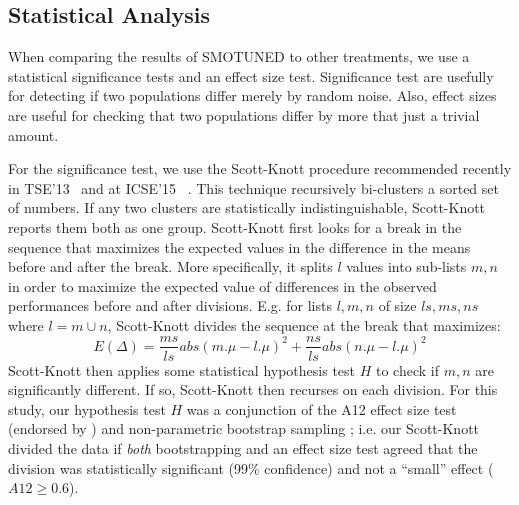\documentclass[10pt,conference]{IEEEtran}
\theoremstyle{break}
\theoremstyle{break}
\begin{document}
   
   
\subsection{Statistical Analysis}

When comparing the results of SMOTUNED to other
treatments, we use a statistical
significance tests and an effect size test.
Significance test are usefully for detecting if two populations
differ merely by random noise. 
Also, effect sizes are useful for checking that two populations differ by more that just a trivial amount.

For the significance test,  we use the 
     Scott-Knott procedure  recommended  recently in TSE'13~\cite{mittas13} and at ICSE'15~\cite{ghotra2015revisiting} . This
     technique recursively bi-clusters a sorted
    set of numbers. If any two clusters are statistically indistinguishable, Scott-Knott
    reports them both as one group.
    Scott-Knott first looks for a break in the sequence that maximizes the expected
    values in the difference in the means before and after the break.
    More specifically,  it  splits $l$ values into sub-lists $m,n$ in order to maximize the expected value of differences  in the observed performances before and after divisions. E.g. for lists $l,m,n$ of size $ls,ms,ns$ where $l=m\cup n$, Scott-Knott divides the sequence at the break that maximizes:
     \[E(\Delta)=\frac{ms}{ls}abs(m.\mu - l.\mu)^2 + \frac{ns}{ls}abs(n.\mu - l.\mu)^2\]
Scott-Knott then applies some statistical hypothesis test $H$ to check if $m,n$ are significantly different. If so, Scott-Knott then recurses on each division.
    For this study, our hypothesis test $H$ was a conjunction of the A12 effect size test (endorsed by
    \cite{arcuri11})  and non-parametric bootstrap sampling \cite{efron94}; i.e. our Scott-Knott divided the data if {\em both}
    bootstrapping and an effect size test agreed that the division was statistically significant (99\% confidence) and not a ``small'' effect ($A12 \ge 0.6$).




\end{document}
